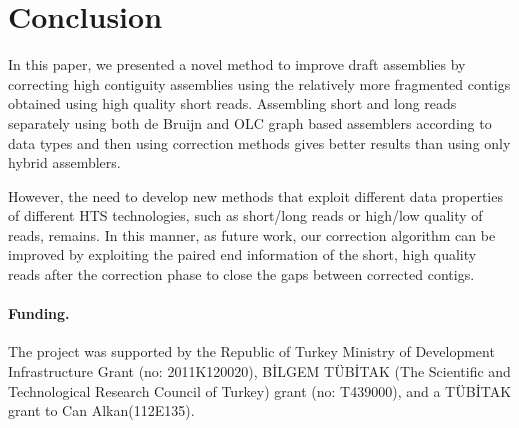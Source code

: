 \documentclass{llncs}
\begin{document}
\section{Conclusion}
\label{concl}
In this paper, we presented a novel method to improve draft assemblies by correcting high contiguity assemblies using the relatively more fragmented contigs obtained using high quality short reads. Assembling short and long reads separately using both de Bruijn and OLC graph based assemblers according to data types and then using correction methods gives better results than using only hybrid assemblers.

However, the need to develop new methods that exploit different data properties of different HTS technologies, such as short/long reads or high/low quality of reads, remains. In this manner, as future work, our correction algorithm can be improved by exploiting the paired end information of the short, high quality reads after the correction phase to close the gaps between corrected contigs.

\paragraph{Funding.}

The project was supported by the Republic of Turkey Ministry of Development Infrastructure Grant (no: 2011K120020), BİLGEM TÜBİTAK (The Scientific and Technological Research Council of Turkey) grant (no: T439000), and a TÜBİTAK grant to Can Alkan(112E135).\\
\end{document}
